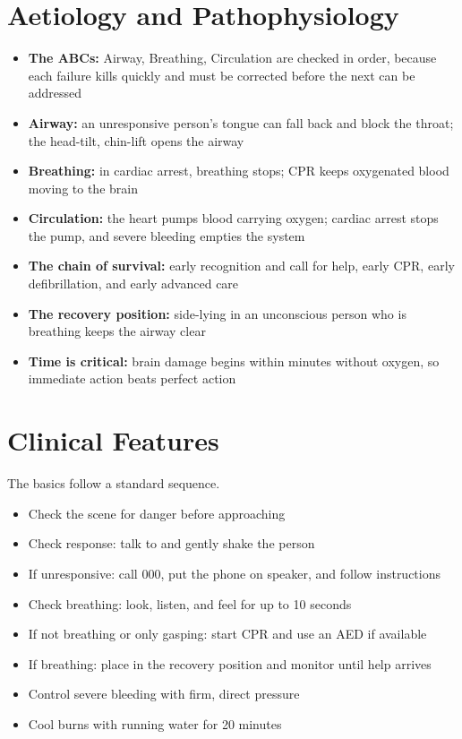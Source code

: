 \section*{Aetiology and Pathophysiology}
\begin{itemize}
    \item \textbf{The ABCs:} Airway, Breathing, Circulation are checked in order, because each failure kills quickly and must be corrected before the next can be addressed
    \item \textbf{Airway:} an unresponsive person's tongue can fall back and block the throat; the head-tilt, chin-lift opens the airway
    \item \textbf{Breathing:} in cardiac arrest, breathing stops; CPR keeps oxygenated blood moving to the brain
    \item \textbf{Circulation:} the heart pumps blood carrying oxygen; cardiac arrest stops the pump, and severe bleeding empties the system
    \item \textbf{The chain of survival:} early recognition and call for help, early CPR, early defibrillation, and early advanced care
    \item \textbf{The recovery position:} side-lying in an unconscious person who is breathing keeps the airway clear
    \item \textbf{Time is critical:} brain damage begins within minutes without oxygen, so immediate action beats perfect action
\end{itemize}

\section*{Clinical Features}
The basics follow a standard sequence.
\begin{itemize}
    \item Check the scene for danger before approaching
    \item Check response: talk to and gently shake the person
    \item If unresponsive: call 000, put the phone on speaker, and follow instructions
    \item Check breathing: look, listen, and feel for up to 10 seconds
    \item If not breathing or only gasping: start CPR and use an AED if available
    \item If breathing: place in the recovery position and monitor until help arrives
    \item Control severe bleeding with firm, direct pressure
    \item Cool burns with running water for 20 minutes
\end{itemize}

